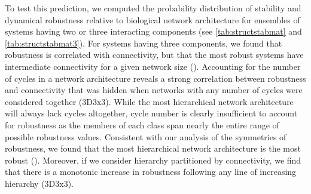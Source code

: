 To test this prediction, we computed the probability distribution of stability and dynamical robustness relative to biological network architecture for ensembles of systems having two or three interacting components (see \ref{tab:structstabmat} and \ref{tab:structstabmat3}). For systems having three components, we found that robustness is correlated with connectivity, but that the most robust systems have intermediate connectivity for a given network size (). Accounting for the number of cycles in a network architecture reveals a strong correlation between robustness and connectivity that was hidden when networks with any number of cycles were considered together (3D3x3). While the most hierarchical network architecture will always lack cycles altogether, cycle number is clearly insufficient to account for robustness as the members of each class span nearly the entire range of possible robustness values. Consistent with our analysis of the symmetries of robustness, we found that the most hierarchical network architecture is the most robust (). Moreover, if we consider hierarchy partitioned by connectivity, we find that there is a monotonic increase in robustness following any line of increasing hierarchy (3D3x3).
